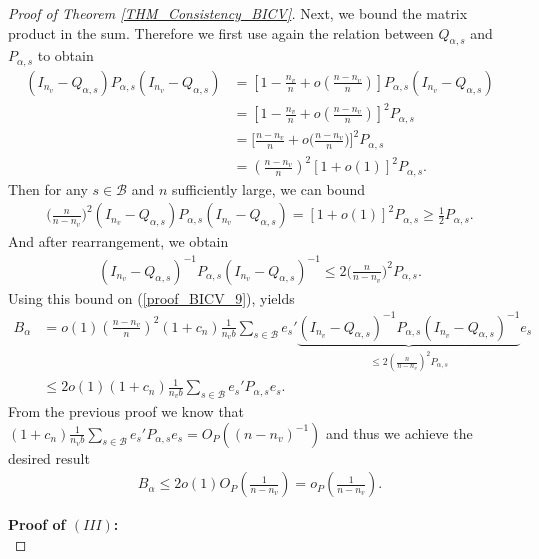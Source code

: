 \documentclass[Research_Module_ES.tex]{subfiles}
\begin{document}
\begin{proof}[Proof of Theorem \ref{THM_Consistency_BICV}]
	Next, we bound the matrix product in the sum. Therefore we first use again the relation between $Q_{\alpha,s}$ and $P_{\alpha,s}$ to obtain
	\begin{align*}
	(I_{n_v}-Q_{\alpha,s})P_{\alpha,s}(I_{n_v}-Q_{\alpha,s})
	&= \left[1-\frac{n_v}{n}+o\left(\frac{n-n_v}{n}\right)\right] P_{\alpha,s}(I_{n_v}-Q_{\alpha,s})\\
	&=\left[1-\frac{n_v}{n}+o\left(\frac{n-n_v}{n}\right)\right]^2 P_{\alpha,s}\\
	&=\biggl[\frac{n-n_v}{n}+o\biggl(\frac{n-n_v}{n}\biggr)\biggr]^2 P_{\alpha,s}\\
	&=\left(\frac{n-n_v}{n}\right)^2[1+o(1)]^2 P_{\alpha,s}.
	\end{align*}
	Then for any $s\in \mathcal{B}$ and $n$ sufficiently large, we can bound
	\begin{align*}
	\biggl(\frac{n}{n-n_v}\biggr)^2 (I_{n_v}-Q_{\alpha,s})P_{\alpha,s}(I_{n_v}-Q_{\alpha,s})=[1+o(1)]^2P_{\alpha,s}\ge \frac{1}{2}P_{\alpha,s}.
	\end{align*}
	And after rearrangement, we obtain 
	\begin{align*}
	(I_{n_v}-Q_{\alpha,s})^{-1}P_{\alpha,s}(I_{n_v}-Q_{\alpha,s})^{-1}\le 2 \biggl(\frac{n}{n-n_v}\biggr)^2P_{\alpha,s}.
	\end{align*}
	Using this bound on (\ref{proof_BICV_9}), yields
	\begin{align*}
	B_\alpha
	&=o(1)\left(\frac{n-n_v}{n}\right)^2(1+c_n)\frac{1}{n_vb}\sum_{s\in \mathcal{B}}e_s'\underbrace{(I_{n_v}-Q_{\alpha,s})^{-1}P_{\alpha,s}(I_{n_v}-Q_{\alpha,s})^{-1}}_{\le 2(\frac{n}{n-n_v})^2P_{\alpha,s}}e_s\\
	&\le 2o(1)(1+c_n)\frac{1}{n_vb}\sum_{s\in \mathcal{B}}e_s'P_{\alpha,s}e_s.
	\end{align*}
	From the previous proof we know that $(1+c_n)\frac{1}{n_vb}\sum_{s\in \mathcal{B}}e_s'P_{\alpha,s}e_s=O_P((n-n_v)^{-1})$ and thus we achieve the desired result
	\begin{align*}
	B_\alpha\le 2o(1)O_P\left(\frac{1}{n-n_v}\right)=o_P\left(\frac{1}{n-n_v}\right).
	\end{align*}
	
	\textbf{Proof of $(III)$:} \\
\end{proof}
\end{document}
